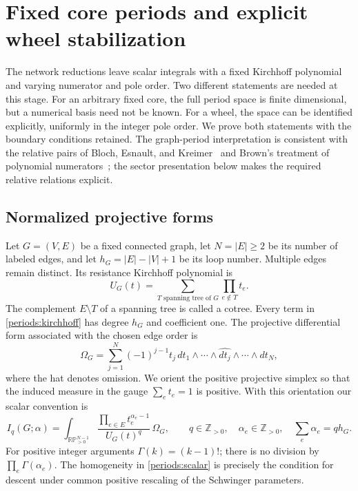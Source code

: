 \section{Fixed core periods and explicit wheel stabilization}
\label{periods:section}

The network reductions leave scalar integrals with a fixed Kirchhoff
polynomial and varying numerator and pole order.  Two different statements
are needed at this stage.  For an arbitrary fixed core, the full period
space is finite dimensional, but a numerical basis need not be known.  For
a wheel, the space can be identified explicitly, uniformly in the integer
pole order.  We prove both statements with the boundary conditions retained.
The graph-period interpretation is consistent with the relative pairs of
Bloch, Esnault, and Kreimer~\cite{bloch2006} and Brown's treatment of
polynomial numerators~\cite[Section~6.7]{brown2015}; the sector presentation
below makes the required relative relations explicit.

\subsection{Normalized projective forms}
\label{periods:normalization}

Let $G=(V,E)$ be a fixed connected graph, let $N=|E|\ge2$ be its number
of labeled edges, and let $h_G=|E|-|V|+1$ be its loop number.  Multiple
edges remain distinct.  Its resistance Kirchhoff polynomial is
\begin{equation}
 U_G(t)=\sum_{T\text{ spanning tree of }G}\prod_{e\notin T}t_e.
 \label{periods:kirchhoff}
\end{equation}
The complement $E\setminus T$ of a spanning tree is called a cotree.
Every term in \eqref{periods:kirchhoff} has degree $h_G$ and coefficient
one.  The projective differential form associated with the chosen edge
order is
\begin{equation}
 \Omega_G=\sum_{j=1}^{N}(-1)^{j-1}t_j\,
 dt_1\wedge\cdots\wedge\widehat{dt_j}\wedge\cdots\wedge dt_N,
 \label{periods:omega}
\end{equation}
where the hat denotes omission.  We orient the positive projective
simplex so that the induced measure in the gauge $\sum_e t_e=1$ is
positive.  With this orientation our scalar convention is
\begin{equation}
 I_q(G;\alpha)=
 \int_{\mathbb{RP}^{N-1}_{>0}}
 \frac{\prod_{e\in E}t_e^{\alpha_e-1}}{U_G(t)^q}\,\Omega_G,
 \qquad
 q\in\mathbb Z_{>0},\quad \alpha_e\in\mathbb Z_{>0},\quad
 \sum_e\alpha_e=q h_G.
 \label{periods:scalar}
\end{equation}
For positive integer arguments $\Gamma(k)=(k-1)!$; there is no division
by $\prod_e\Gamma(\alpha_e)$.  The homogeneity in
\eqref{periods:scalar} is precisely the condition for descent under
common positive rescaling of the Schwinger parameters.

